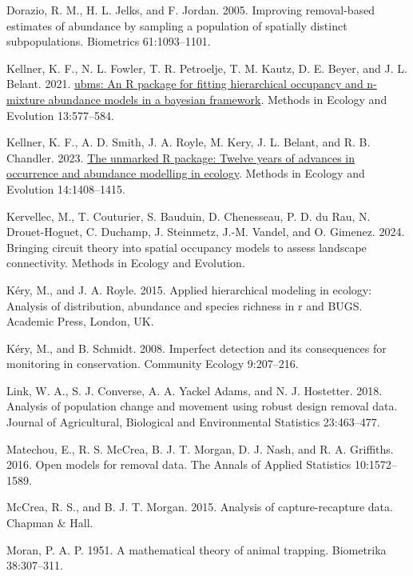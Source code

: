 \documentclass[
  11pt,
  a4paper,
]{article}
\newlength{\cslhangindent}
\newenvironment{CSLReferences}[2] %
 {\begin{list}{}{%
  \setlength{\itemindent}{0pt}
  \setlength{\leftmargin}{0pt}
  \setlength{\parsep}{0pt}
  \ifodd #1
   \setlength{\leftmargin}{\cslhangindent}
   \setlength{\itemindent}{-1\cslhangindent}
  \fi
  \setlength{\itemsep}{#2\baselineskip}}}
 {\end{list}}
\begin{document}
\begin{CSLReferences}{1}{0}
Dorazio, R. M., H. L. Jelks, and F. Jordan. 2005. Improving removal-based estimates of abundance by sampling a population of spatially distinct subpopulations. Biometrics 61:1093--1101.

Kellner, K. F., N. L. Fowler, T. R. Petroelje, T. M. Kautz, D. E. Beyer, and J. L. Belant. 2021. \href{https://doi.org/10.1111/2041-210X.13777}{{ubms}: An {R} package for fitting hierarchical occupancy and n-mixture abundance models in a bayesian framework}. Methods in Ecology and Evolution 13:577--584.

Kellner, K. F., A. D. Smith, J. A. Royle, M. Kery, J. L. Belant, and R. B. Chandler. 2023. \href{https://www.jstatsoft.org/v43/i10/}{The {unmarked} {R} package: Twelve years of advances in occurrence and abundance modelling in ecology}. Methods in Ecology and Evolution 14:1408--1415.

Kervellec, M., T. Couturier, S. Bauduin, D. Chenesseau, P. D. du Rau, N. Drouet-Hoguet, C. Duchamp, J. Steinmetz, J.-M. Vandel, and O. Gimenez. 2024. Bringing circuit theory into spatial occupancy models to assess landscape connectivity. Methods in Ecology and Evolution.

Kéry, M., and J. A. Royle. 2015. Applied hierarchical modeling in ecology: Analysis of distribution, abundance and species richness in r and BUGS. Academic Press, London, UK.

Kéry, M., and B. Schmidt. 2008. Imperfect detection and its consequences for monitoring in conservation. Community Ecology 9:207--216.

Link, W. A., S. J. Converse, A. A. Yackel Adams, and N. J. Hostetter. 2018. Analysis of population change and movement using robust design removal data. Journal of Agricultural, Biological and Environmental Statistics 23:463--477.

Matechou, E., R. S. McCrea, B. J. T. Morgan, D. J. Nash, and R. A. Griffiths. 2016. {Open models for removal data}. The Annals of Applied Statistics 10:1572--1589.

McCrea, R. S., and B. J. T. Morgan. 2015. Analysis of capture-recapture data. Chapman \& Hall.

Moran, P. A. P. 1951. A mathematical theory of animal trapping. Biometrika 38:307--311.


\end{CSLReferences}
\end{document}

